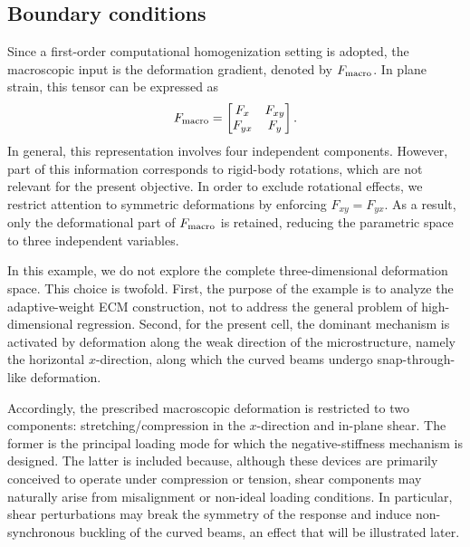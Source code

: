 \documentclass[11pt,a4paper]{article}
\newcommand{\PROMPT}[1]{ }
\begin{document}
\subsection{Boundary conditions}

\PROMPT{}



Since a first-order computational homogenization setting is adopted, the
macroscopic input is the deformation gradient, denoted by $F_{\mathrm{macro}}$. In plane
strain, this tensor can be expressed as
\[
F_{\mathrm{macro}}
=
\begin{bmatrix}
F_x & F_{xy} \\
F_{yx} & F_y
\end{bmatrix}.
\]
In general, this representation involves four independent components. However,
part of this information corresponds to rigid-body rotations, which are not
relevant for the present objective. In order to exclude rotational effects, we
restrict attention to symmetric deformations by enforcing $F_{xy} = F_{yx}$.
As a result, only the deformational part of $F_{\mathrm{macro}}$ is retained, reducing the
parametric space to three independent variables.

In this example, we do not explore the complete three-dimensional deformation
space. This choice is twofold. First, the purpose of the example is to analyze
the adaptive-weight ECM construction, not to address the general problem of
high-dimensional regression. Second, for the present cell, the dominant
mechanism is activated by deformation along the weak direction of the
microstructure, namely the horizontal \(x\)-direction, along which the curved
beams undergo snap-through-like deformation.

Accordingly, the prescribed macroscopic deformation is restricted to two
components: stretching/compression in the \(x\)-direction and in-plane shear.
The former is the principal loading mode for which the negative-stiffness
mechanism is designed. The latter is included because, although these devices
are primarily conceived to operate under compression or tension, shear
components may naturally arise from misalignment or non-ideal loading
conditions. In particular, shear perturbations may break the symmetry of the
response and induce non-synchronous buckling of the curved beams, an effect that
will be illustrated later.
\end{document}
